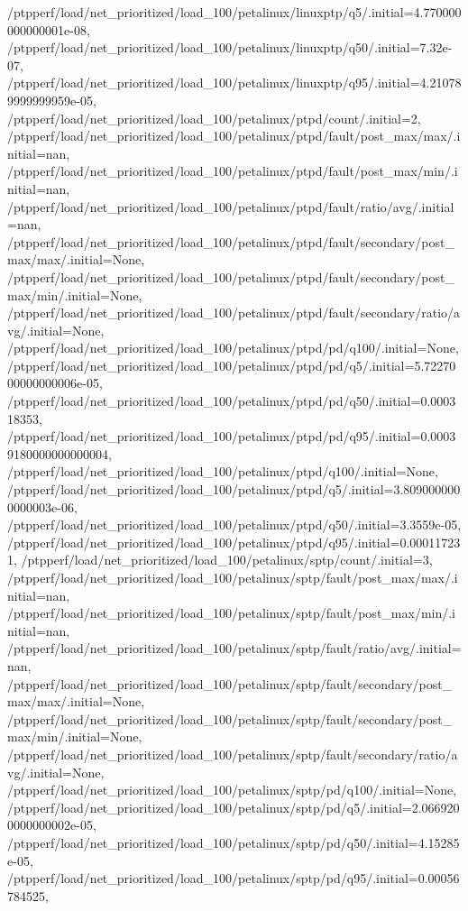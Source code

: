 {    /ptpperf/load/net_prioritized/load_100/petalinux/linuxptp/q5/.initial=4.770000000000001e-08,
    /ptpperf/load/net_prioritized/load_100/petalinux/linuxptp/q50/.initial=7.32e-07,
    /ptpperf/load/net_prioritized/load_100/petalinux/linuxptp/q95/.initial=4.210789999999959e-05,
    /ptpperf/load/net_prioritized/load_100/petalinux/ptpd/count/.initial=2,
    /ptpperf/load/net_prioritized/load_100/petalinux/ptpd/fault/post_max/max/.initial=nan,
    /ptpperf/load/net_prioritized/load_100/petalinux/ptpd/fault/post_max/min/.initial=nan,
    /ptpperf/load/net_prioritized/load_100/petalinux/ptpd/fault/ratio/avg/.initial=nan,
    /ptpperf/load/net_prioritized/load_100/petalinux/ptpd/fault/secondary/post_max/max/.initial=None,
    /ptpperf/load/net_prioritized/load_100/petalinux/ptpd/fault/secondary/post_max/min/.initial=None,
    /ptpperf/load/net_prioritized/load_100/petalinux/ptpd/fault/secondary/ratio/avg/.initial=None,
    /ptpperf/load/net_prioritized/load_100/petalinux/ptpd/pd/q100/.initial=None,
    /ptpperf/load/net_prioritized/load_100/petalinux/ptpd/pd/q5/.initial=5.7227000000000006e-05,
    /ptpperf/load/net_prioritized/load_100/petalinux/ptpd/pd/q50/.initial=0.000318353,
    /ptpperf/load/net_prioritized/load_100/petalinux/ptpd/pd/q95/.initial=0.00039180000000000004,
    /ptpperf/load/net_prioritized/load_100/petalinux/ptpd/q100/.initial=None,
    /ptpperf/load/net_prioritized/load_100/petalinux/ptpd/q5/.initial=3.8090000000000003e-06,
    /ptpperf/load/net_prioritized/load_100/petalinux/ptpd/q50/.initial=3.3559e-05,
    /ptpperf/load/net_prioritized/load_100/petalinux/ptpd/q95/.initial=0.000117231,
    /ptpperf/load/net_prioritized/load_100/petalinux/sptp/count/.initial=3,
    /ptpperf/load/net_prioritized/load_100/petalinux/sptp/fault/post_max/max/.initial=nan,
    /ptpperf/load/net_prioritized/load_100/petalinux/sptp/fault/post_max/min/.initial=nan,
    /ptpperf/load/net_prioritized/load_100/petalinux/sptp/fault/ratio/avg/.initial=nan,
    /ptpperf/load/net_prioritized/load_100/petalinux/sptp/fault/secondary/post_max/max/.initial=None,
    /ptpperf/load/net_prioritized/load_100/petalinux/sptp/fault/secondary/post_max/min/.initial=None,
    /ptpperf/load/net_prioritized/load_100/petalinux/sptp/fault/secondary/ratio/avg/.initial=None,
    /ptpperf/load/net_prioritized/load_100/petalinux/sptp/pd/q100/.initial=None,
    /ptpperf/load/net_prioritized/load_100/petalinux/sptp/pd/q5/.initial=2.0669200000000002e-05,
    /ptpperf/load/net_prioritized/load_100/petalinux/sptp/pd/q50/.initial=4.15285e-05,
    /ptpperf/load/net_prioritized/load_100/petalinux/sptp/pd/q95/.initial=0.00056784525,
}
